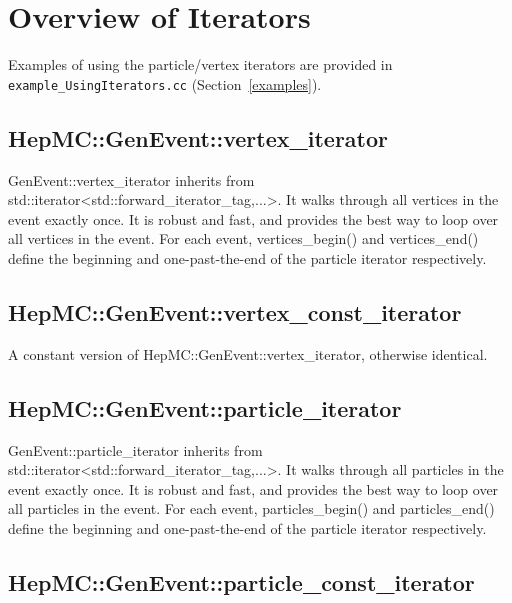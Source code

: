 \documentclass[11pt,letterpaper]{article}
\begin{document}
\section{Overview of Iterators}
\label{iterators}

Examples of using the particle/vertex iterators are provided in
\verb!example_UsingIterators.cc! (Section~\ref{examples}).

%
%

\subsection{HepMC::GenEvent::vertex\_iterator}

GenEvent::vertex\_iterator inherits from 
std::iterator<std::forward\_iterator\_tag,...>. 
It walks through all vertices in the event exactly once. It is robust and
fast, and provides the best way to loop over all vertices in the
event. For each event,
vertices\_begin() and vertices\_end() define the beginning and
one-past-the-end of the particle iterator respectively.


%
%

\subsection{HepMC::GenEvent::vertex\_const\_iterator}

A constant version of HepMC::GenEvent::vertex\_iterator, otherwise identical.

%
%

\subsection{HepMC::GenEvent::particle\_iterator}

GenEvent::particle\_iterator inherits from 
std::iterator<std::forward\_iterator\_tag,...>.
It walks through all particles in the
event exactly once. It is robust and fast, and provides the best way
to loop over all particles in the event. For each event,
particles\_begin() and particles\_end() define the beginning and
one-past-the-end of the particle iterator respectively.


%
%

\subsection{HepMC::GenEvent::particle\_const\_iterator}
\end{document}
